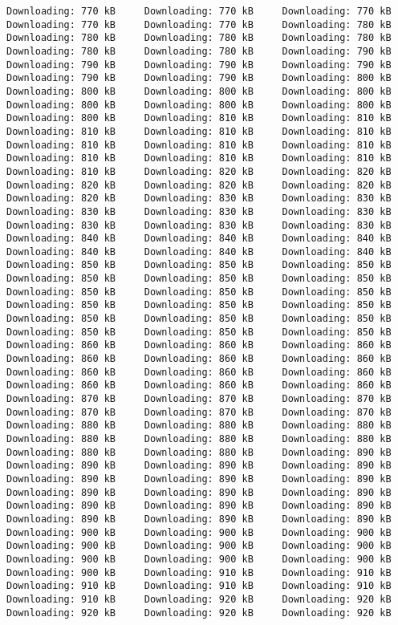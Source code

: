 \documentclass[
  12pt,
]{report}
\begin{document}
\begin{verbatim}
Downloading: 770 kB     Downloading: 770 kB     Downloading: 770 kB     Downloading: 770 kB     Downloading: 770 kB     Downloading: 780 kB     Downloading: 780 kB     Downloading: 780 kB     Downloading: 780 kB     Downloading: 780 kB     Downloading: 780 kB     Downloading: 790 kB     Downloading: 790 kB     Downloading: 790 kB     Downloading: 790 kB     Downloading: 790 kB     Downloading: 790 kB     Downloading: 800 kB     Downloading: 800 kB     Downloading: 800 kB     Downloading: 800 kB     Downloading: 800 kB     Downloading: 800 kB     Downloading: 800 kB     Downloading: 800 kB     Downloading: 810 kB     Downloading: 810 kB     Downloading: 810 kB     Downloading: 810 kB     Downloading: 810 kB     Downloading: 810 kB     Downloading: 810 kB     Downloading: 810 kB     Downloading: 810 kB     Downloading: 810 kB     Downloading: 810 kB     Downloading: 810 kB     Downloading: 820 kB     Downloading: 820 kB     Downloading: 820 kB     Downloading: 820 kB     Downloading: 820 kB     Downloading: 820 kB     Downloading: 830 kB     Downloading: 830 kB     Downloading: 830 kB     Downloading: 830 kB     Downloading: 830 kB     Downloading: 830 kB     Downloading: 830 kB     Downloading: 830 kB     Downloading: 840 kB     Downloading: 840 kB     Downloading: 840 kB     Downloading: 840 kB     Downloading: 840 kB     Downloading: 840 kB     Downloading: 850 kB     Downloading: 850 kB     Downloading: 850 kB     Downloading: 850 kB     Downloading: 850 kB     Downloading: 850 kB     Downloading: 850 kB     Downloading: 850 kB     Downloading: 850 kB     Downloading: 850 kB     Downloading: 850 kB     Downloading: 850 kB     Downloading: 850 kB     Downloading: 850 kB     Downloading: 850 kB     Downloading: 850 kB     Downloading: 850 kB     Downloading: 850 kB     Downloading: 860 kB     Downloading: 860 kB     Downloading: 860 kB     Downloading: 860 kB     Downloading: 860 kB     Downloading: 860 kB     Downloading: 860 kB     Downloading: 860 kB     Downloading: 860 kB     Downloading: 860 kB     Downloading: 860 kB     Downloading: 860 kB     Downloading: 870 kB     Downloading: 870 kB     Downloading: 870 kB     Downloading: 870 kB     Downloading: 870 kB     Downloading: 870 kB     Downloading: 880 kB     Downloading: 880 kB     Downloading: 880 kB     Downloading: 880 kB     Downloading: 880 kB     Downloading: 880 kB     Downloading: 880 kB     Downloading: 880 kB     Downloading: 890 kB     Downloading: 890 kB     Downloading: 890 kB     Downloading: 890 kB     Downloading: 890 kB     Downloading: 890 kB     Downloading: 890 kB     Downloading: 890 kB     Downloading: 890 kB     Downloading: 890 kB     Downloading: 890 kB     Downloading: 890 kB     Downloading: 890 kB     Downloading: 890 kB     Downloading: 890 kB     Downloading: 890 kB     Downloading: 900 kB     Downloading: 900 kB     Downloading: 900 kB     Downloading: 900 kB     Downloading: 900 kB     Downloading: 900 kB     Downloading: 900 kB     Downloading: 900 kB     Downloading: 900 kB     Downloading: 900 kB     Downloading: 910 kB     Downloading: 910 kB     Downloading: 910 kB     Downloading: 910 kB     Downloading: 910 kB     Downloading: 910 kB     Downloading: 920 kB     Downloading: 920 kB     Downloading: 920 kB     Downloading: 920 kB     Downloading: 920 kB     
\end{verbatim}
\end{document}
